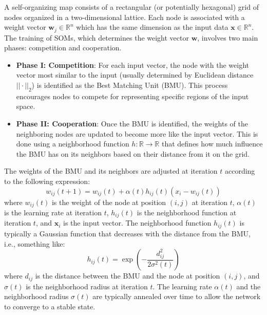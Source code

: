 \documentclass{article}[11pt]
\begin{document}
A self-organizing map consists of a rectangular (or potentially hexagonal) grid of nodes organized in a two-dimensional lattice. 
Each node is associated with a weight vector $\mathbf{w}_{j}\in\mathbb{R}^{n}$ which has the same dimension as the input data $\mathbf{x}\in\mathbb{R}^{n}$.
The training of SOMs, which determines the weight vector $\mathbf{w}$, involves two main phases: competition and cooperation.
\begin{itemize}[leftmargin=16pt]
   \item{\textbf{Phase I: Competition}: For each input vector, the node with the weight vector most similar to the input (usually determined by Euclidean distance $||\cdot||_{2}$) is identified as the Best Matching Unit (BMU). 
   This process encourages nodes to compete for representing specific regions of the input space.}
   \item{\textbf{Phase II: Cooperation}: Once the BMU is identified, the weights of the neighboring nodes are updated to become more like the input vector. 
   This is done using a neighborhood function $h:\mathbb{R}\rightarrow\mathbb{R}$ that defines how much influence the BMU 
   has on its neighbors based on their distance from it on the grid.}
\end{itemize}
The weights of the BMU and its neighbors are adjusted at iteration $t$ according to the following expression:
\begin{equation}
   w_{ij}(t+1) = w_{ij}(t) + \alpha(t)h_{ij}(t)(x_i - w_{ij}(t))
\end{equation}
where $w_{ij}(t)$ is the weight of the node at position $(i,j)$ at iteration $t$, 
$\alpha(t)$ is the learning rate at iteration $t$, 
$h_{ij}(t)$ is the neighborhood function at iteration $t$, and $\mathbf{x}_i$ is the input vector.
The neighborhood function $h_{ij}(t)$ is typically a Gaussian function that decreases with the distance from the BMU, i.e., something like:
\begin{equation}
   h_{ij}(t) = \exp\left(-\frac{d_{ij}^2}{2\sigma^2(t)}\right)
\end{equation}
where $d_{ij}$ is the distance between the BMU and the node at position $(i,j)$, and $\sigma(t)$ is the neighborhood radius at iteration $t$.
The learning rate $\alpha(t)$ and the neighborhood radius $\sigma(t)$ are typically annealed over time to allow the network to converge to a stable state.
\end{document}
